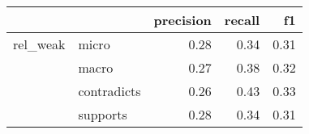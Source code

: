 \begin{tabular}{llrrr}
\toprule
         &          &  precision &  recall &   f1 \\
\midrule
rel\_weak & micro &       0.28 &    0.34 & 0.31 \\
         & macro &       0.27 &    0.38 & 0.32 \\
         & contradicts &       0.26 &    0.43 & 0.33 \\
         & supports &       0.28 &    0.34 & 0.31 \\
\bottomrule
\end{tabular}
